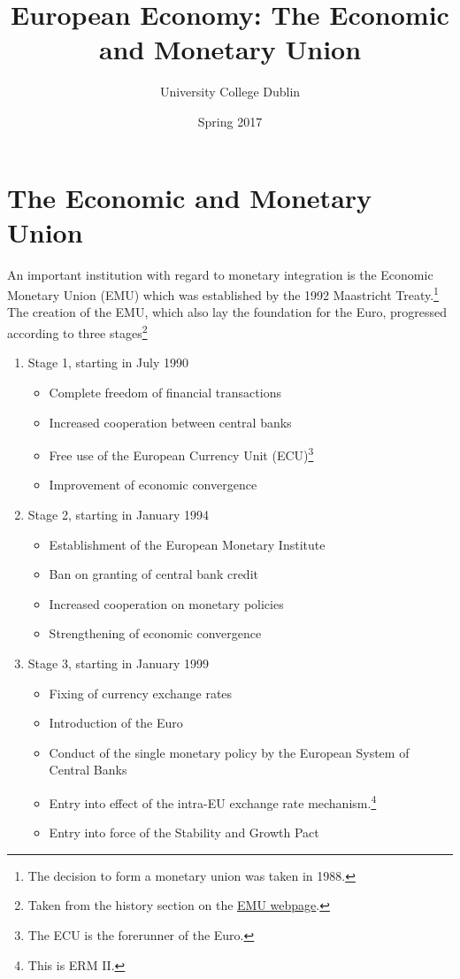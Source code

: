 \documentclass{tufte-handout}
\title{European Economy: The Economic and Monetary Union}
\author{University College Dublin}
\date{Spring 2017}
\begin{document}
\maketitle  
\section{The Economic and Monetary Union}
An important institution with regard to monetary integration is the Economic Monetary Union (EMU) which was established by the 1992 Maastricht Treaty.\footnote{The decision to form a monetary union was taken in 1988.} 
The creation of the EMU, which also lay the foundation for the Euro, progressed according to three stages\footnote{Taken from the history section on the \href{https://www.ecb.europa.eu/ecb/history/emu/html/index.en.html}{EMU webpage}.}

\begin{enumerate}
  \item Stage 1, starting in July 1990
  \begin{itemize}
    \item Complete freedom of financial transactions
    \item Increased cooperation between central banks
    \item Free use of the European Currency Unit (ECU)\footnote{The ECU is the forerunner of the Euro.}
    \item Improvement of economic convergence
  \end{itemize}
  \item Stage 2, starting in January 1994
  \begin{itemize}
    \item Establishment of the European Monetary Institute
    \item Ban on granting of central bank credit
    \item Increased cooperation on monetary policies
    \item Strengthening of economic convergence
  \end{itemize}
  \item Stage 3, starting in January 1999
  \begin{itemize}
    \item Fixing of currency exchange rates
    \item Introduction of the Euro
    \item Conduct of the single monetary policy by the European System of Central Banks
    \item Entry into effect of the intra-EU exchange rate mechanism.\footnote{This is ERM II.}
    \item Entry into force of the Stability and Growth Pact
  \end{itemize}
\end{enumerate}
\end{document}
